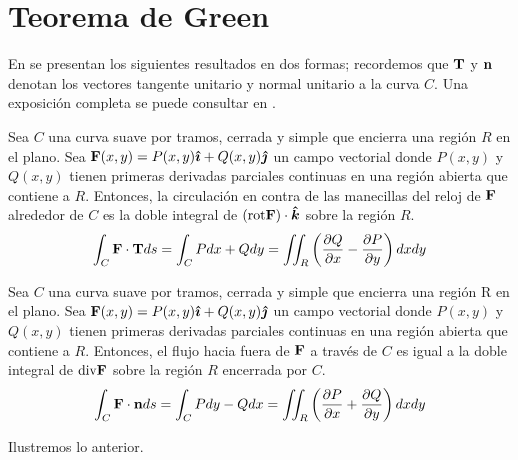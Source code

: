 \section{Teorema de Green} \label{teoremadegreen}
En \cite{thomas_calculo_2015} se presentan los siguientes resultados en dos formas; recordemos que ${\bf T}$ y ${\bf n}$
denotan los vectores tangente unitario y normal unitario a la curva $C$.
Una exposición completa se puede consultar en \cite{acosta_gempeler_doce_2020}.
\begin{teorema}
Sea $C$ una curva suave por tramos, cerrada y simple que encierra una región $R$ en el plano. Sea ${\bf F} (x,y)=P(x,y)\boldsymbol{\hat{\imath}}+Q(x,y)\boldsymbol{\hat{\jmath}}$ un campo vectorial donde $P(x,y)$ y $Q(x,y)$ tienen primeras derivadas parciales continuas en una región abierta que contiene a $R$. Entonces, la circulación en contra de las manecillas del reloj de ${\bf F}$ alrededor de $C$ es la doble integral de $({\rm rot}{\bf F})\cdot \boldsymbol{\hat{k}}$
sobre la región $R$.  
\begin{equation}
\int_C {\bf F}\cdot{\bf T}ds=\int_C Pdx+Qdy=\iint_R \left(\frac{\partial Q}{\partial x}-\frac{\partial P}{\partial y}\right)dxdy
\end{equation}
\end{teorema}

\begin{teorema}
Sea $C$ una curva suave por tramos, cerrada y simple que encierra una región R en el plano.
Sea ${\bf F} (x,y)=P(x,y)\boldsymbol{\hat{\imath}}+Q(x,y)\boldsymbol{\hat{\jmath}}$ un campo vectorial donde $P(x,y)$ y $Q(x,y)$ tienen primeras derivadas parciales continuas en una región abierta que contiene a $R$. Entonces, el flujo hacia fuera de ${\bf F}$ a través de $C$ es igual a la doble integral de ${\rm div}{\bf F}$ sobre la región $R$ encerrada por $C$. 
\begin{equation}
\int_C{\bf F}\cdot{\bf n}ds=\int_C Pdy-Qdx=\iint_R \left(\frac{\partial P}{\partial x}+\frac{\partial Q}{\partial y}\right)dxdy
\end{equation}
\end{teorema}

Ilustremos lo anterior.

\begin{ejemplo}
\end{ejemplo}

